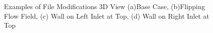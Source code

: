 \documentclass[12pt, oneside]{article}
\begin{document}
\begin{figure}[H]
\centering
{}

\caption{{\footnotesize Examples of File Modifications 3D View (a)Base Case, (b)Flipping Flow Field, (c) Wall on Left Inlet at Top, (d) Wall on Right Inlet at Top}}
\label{fig: } 
\end{figure}
\end{document}
